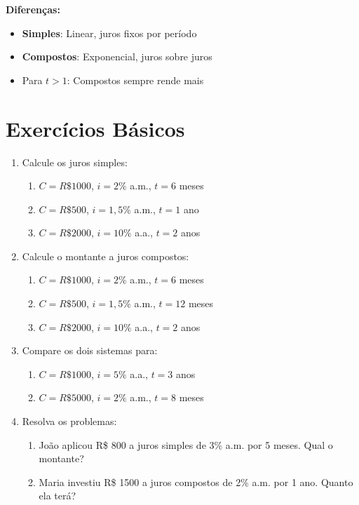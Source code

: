 \documentclass[11pt]{article}
\begin{document}
\begin{multicols}{2}
\textbf{Diferenças:}
\begin{itemize}
\item \textbf{Simples}: Linear, juros fixos por período
\item \textbf{Compostos}: Exponencial, juros sobre juros
\item Para $t > 1$: Compostos sempre rende mais
\end{itemize}

\section*{Exercícios Básicos}

\begin{enumerate}[leftmargin=*]

\item Calcule os juros simples:
\begin{enumerate}[label=\alph*)]
\item $C = R\$ 1000$, $i = 2\%$ a.m., $t = 6$ meses
\item $C = R\$ 500$, $i = 1,5\%$ a.m., $t = 1$ ano
\item $C = R\$ 2000$, $i = 10\%$ a.a., $t = 2$ anos
\end{enumerate}

\item Calcule o montante a juros compostos:
\begin{enumerate}[label=\alph*)]
\item $C = R\$ 1000$, $i = 2\%$ a.m., $t = 6$ meses
\item $C = R\$ 500$, $i = 1,5\%$ a.m., $t = 12$ meses
\item $C = R\$ 2000$, $i = 10\%$ a.a., $t = 2$ anos
\end{enumerate}

\item Compare os dois sistemas para:
\begin{enumerate}[label=\alph*)]
\item $C = R\$ 1000$, $i = 5\%$ a.a., $t = 3$ anos
\item $C = R\$ 5000$, $i = 2\%$ a.m., $t = 8$ meses
\end{enumerate}

\item Resolva os problemas:
\begin{enumerate}[label=\alph*)]
\item João aplicou R\$ 800 a juros simples de 3\% a.m. por 5 meses. Qual o montante?
\item Maria investiu R\$ 1500 a juros compostos de 2\% a.m. por 1 ano. Quanto ela terá?
\end{enumerate}


\end{enumerate}
\end{multicols}
\end{document}
